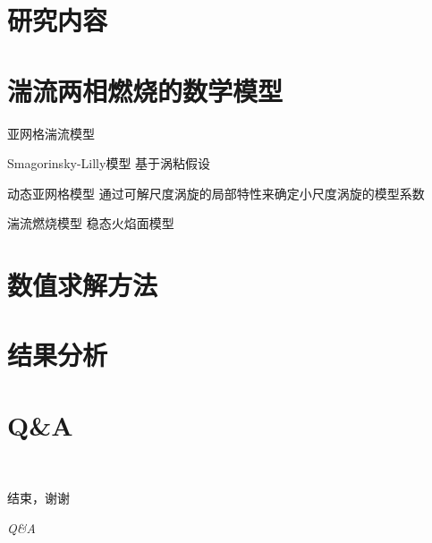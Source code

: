 \documentclass[nomath]{beamer}%
\begin{document}
\section{研究内容}
\section{湍流两相燃烧的数学模型}
\begin{frame}{亚网格湍流模型}
  \begin{block}{Smagorinsky-Lilly模型}
    基于涡粘假设
  \end{block}
  \begin{block}{动态亚网格模型}
    通过可解尺度涡旋的局部特性来确定小尺度涡旋的模型系数
  \end{block}
\end{frame}
\begin{frame}{湍流燃烧模型}
稳态火焰面模型
\end{frame}
\section{数值求解方法}
\section{结果分析}
\section{Q\&A}
\begin{frame}{\secname~ }
	\begin{center}
 		\huge {\kaishu 结束，谢谢}
		
		\huge \textit {Q\&A}
	\end{center}
\end{frame}
\end{document}
